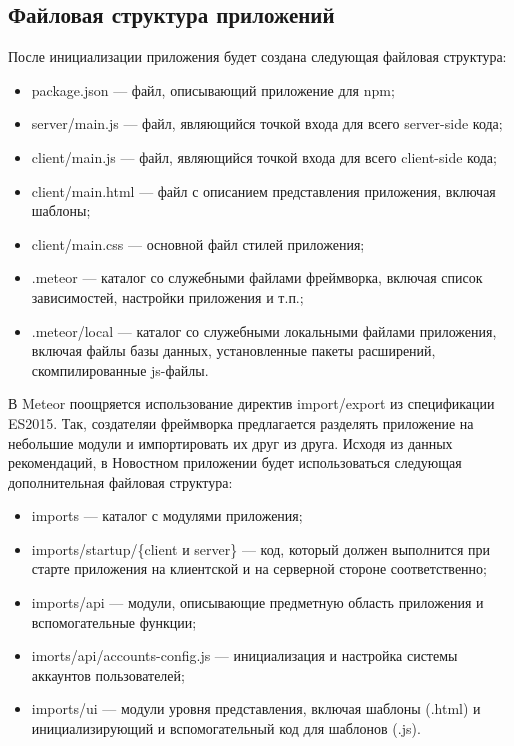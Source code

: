 \documentclass[a4paper,12pt]{article}
\begin{document}
\subsection{Файловая структура приложений}

После инициализации приложения будет создана следующая файловая структура:
\begin{itemize}
	\item package.json --- файл, описывающий приложение для npm;
	\item server/main.js --- файл, являющийся точкой входа для
	всего server-side кода;
	\item client/main.js --- файл, являющийся точкой входа для
	всего client-side кода;
	\item client/main.html --- файл с описанием представления приложения,
	включая шаблоны;
	\item client/main.css --- основной файл стилей приложения;
	\item .meteor --- каталог со служебными файлами фреймворка,
	включая список зависимостей, настройки приложения и т.п.;
	\item .meteor/local --- каталог со служебными локальными файлами 
	приложения, включая файлы базы данных, установленные пакеты 
	расширений, скомпилированные js-файлы.
\end{itemize}

В Meteor поощряется использование директив import/export из спецификации
ES2015. Так, создателяи фреймворка предлагается разделять приложение
на небольшие модули и импортировать их друг из друга. Исходя из
данных рекомендаций, в Новостном приложении будет использоваться следующая
дополнительная файловая структура:

\begin{itemize}
	\item imports --- каталог с модулями приложения;
	\item imports/startup/\{client и server\} --- код, который должен выполнится
	при старте приложения на клиентской и на серверной стороне соответственно;
	\item imports/api --- модули, описывающие предметную область приложения
	и вспомогательные функции;
	\item imorts/api/accounts-config.js --- инициализация и настройка системы аккаунтов пользователей;
	\item imports/ui --- модули уровня представления, включая шаблоны (.html) 
	и инициализирующий и вспомогательный код для шаблонов (.js).
\end{itemize}
\end{document}

